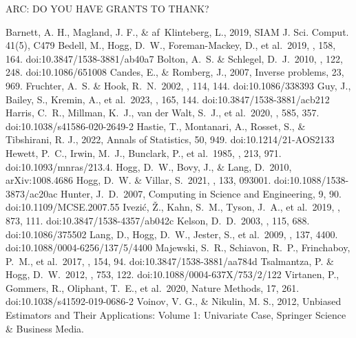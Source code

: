 \documentclass[modern]{aastex631}
\begin{document}
ARC: DO YOU HAVE GRANTS TO THANK?

\begin{thebibliography}{dummy}
Barnett, A. H., Magland, J. F., \& af~Klinteberg, L., 2019, SIAM J. Sci. Comput. 41(5), C479
 Bedell, M., Hogg, D.~W., Foreman-Mackey, D., et al.\ 2019, \aj, 158, 164. doi:10.3847/1538-3881/ab40a7
 Bolton, A.~S. \& Schlegel, D.~J.\ 2010, \pasp, 122, 248. doi:10.1086/651008
 Candes, E., \& Romberg, J., 2007, Inverse problems, 23, 969.
 Fruchter, A.~S. \& Hook, R.~N.\ 2002, \pasp, 114, 144. doi:10.1086/338393
 Guy, J., Bailey, S., Kremin, A., et al.\ 2023, \aj, 165, 144. doi:10.3847/1538-3881/acb212
 Harris, C.~R., Millman, K.~J., van der Walt, S.~J., et al.\ 2020, \nat, 585, 357. doi:10.1038/s41586-020-2649-2
 Hastie, T., Montanari, A., Rosset, S., \& Tibshirani, R. J., 2022, Annals of Statistics, 50, 949. doi:10.1214/21-AOS2133
 Hewett, P.~C., Irwin, M.~J., Bunclark, P., et al.\ 1985, \mnras, 213, 971. doi:10.1093/mnras/213.4.
 Hogg, D.~W., Bovy, J., \& Lang, D.\ 2010, arXiv:1008.4686
 Hogg, D.~W. \& Villar, S.\ 2021, \pasp, 133, 093001. doi:10.1088/1538-3873/ac20ac
 Hunter, J.~D.\ 2007, Computing in Science and Engineering, 9, 90. doi:10.1109/MCSE.2007.55
 Ivezi{\'c}, {\v{Z}}., Kahn, S.~M., Tyson, J.~A., et al.\ 2019, \apj, 873, 111. doi:10.3847/1538-4357/ab042c
 Kelson, D.~D.\ 2003, \pasp, 115, 688. doi:10.1086/375502
 Lang, D., Hogg, D.~W., Jester, S., et al.\ 2009, \aj, 137, 4400. doi:10.1088/0004-6256/137/5/4400
 Majewski, S.~R., Schiavon, R.~P., Frinchaboy, P.~M., et al.\ 2017, \aj, 154, 94. doi:10.3847/1538-3881/aa784d
 Tsalmantza, P. \& Hogg, D.~W.\ 2012, \apj, 753, 122. doi:10.1088/0004-637X/753/2/122
 Virtanen, P., Gommers, R., Oliphant, T.~E., et al.\ 2020, Nature Methods, 17, 261. doi:10.1038/s41592-019-0686-2
 Voinov, V. G., \& Nikulin, M. S., 2012, Unbiased Estimators and Their Applications: Volume 1: Univariate Case, Springer Science \& Business Media.

\end{thebibliography}
\end{document}
